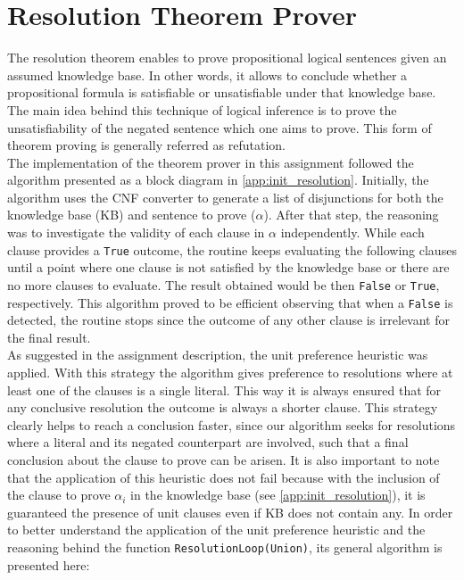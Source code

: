 \documentclass[11pt,journal,compsoc]{IEEEtran}
\begin{document}
\section{Resolution Theorem Prover}
The resolution theorem enables to prove propositional logical sentences given an assumed knowledge base.  In other words, it allows to conclude whether a propositional formula is satisfiable or unsatisfiable under that knowledge base. The main idea behind this technique of logical inference is to prove the unsatisfiability of the negated sentence which one aims to prove. This form of theorem proving is generally referred as refutation.\\
The implementation of the theorem prover in this assignment followed the algorithm presented as a block diagram in \ref{app:init_resolution}. Initially, the algorithm uses the CNF converter to generate a list of disjunctions for both the knowledge base (KB) and sentence to prove ($\alpha$). After that step, the reasoning was to investigate the validity of each clause in $\alpha$ independently. While each clause provides a \texttt{True} outcome, the routine keeps evaluating the following clauses until a point where one clause is not satisfied by the knowledge base or there are no more clauses to evaluate. The result obtained would be then \texttt{False} or \texttt{True}, respectively. This algorithm proved to be efficient observing that when a \texttt{False} is detected, the routine stops since the outcome of any other clause is irrelevant for the final result.\\
As suggested in the assignment description, the unit preference heuristic was applied. With this strategy the algorithm gives preference to resolutions where at least one of the clauses is a single literal. This way it is always ensured that for any conclusive resolution the outcome is always a shorter clause. This strategy clearly helps to reach a conclusion faster, since our algorithm seeks for resolutions where a literal and its negated counterpart are involved, such that a final conclusion about the clause to prove can be arisen. It is also important to note that the application of this heuristic does not fail because with the inclusion of the clause to prove $\alpha_i$ in the knowledge base (see \ref{app:init_resolution}), it is guaranteed the presence of unit clauses even if KB does not contain any.
In order to better understand the application of the unit preference heuristic and the reasoning behind the function \texttt{ResolutionLoop(Union)}, its general algorithm is presented here:\\
\end{document}
